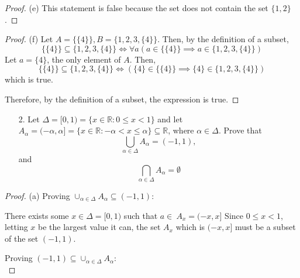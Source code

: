 \documentclass[10pt]{article}
\theoremstyle{definition}
\theoremstyle{plain}
\newcommand{\R}{\mathbb{R}}
\begin{document}
\begin{proof}{(e)}
  This statement is false because the set does not contain the set $\{1,2\}$.
\end{proof}

\begin{proof}{(f)}
  Let $A=\{\{4\}\}, B = \{1,2,3,\{4\}\}$. Then, by the definition of a subset,
  \begin{equation*}
    \{\{4\}\} \subseteq \{1,2,3,\{4\}\} \iff \forall a(a\in \{\{4\}\} \implies a\in \{1,2,3,\{4\}\})
  \end{equation*}
  Let $a=\{4\}$, the only element of $A$. Then,
  \begin{equation*}
      \{\{4\}\} \subseteq \{1,2,3,\{4\}\} \iff (\{4\}\in \{\{4\}\} \implies \{4\}\in \{1,2,3,\{4\}\})
  \end{equation*}
  which is true. \\

  \par Therefore, by the definition of a subset, the expression is true.
\end{proof}



\pagebreak



\begin{enumerate}
  \item[2.] Let $\Delta = [0,1) = \{x \in \R: 0 \leq x < 1\}$ and let $A_\alpha = (-\alpha,\alpha] = \{x \in \R: -\alpha < x \leq \alpha\} \subseteq \R$, where $\alpha \in \Delta$.  Prove that
      $$\bigcup_{\alpha \in \Delta} A_\alpha = (-1,1),$$
   and
      $$\bigcap_{\alpha \in \Delta} A_\alpha = \emptyset$$
\end{enumerate}

\begin{proof}{(a)}
  Proving $\cup_{\alpha \in \Delta} A_\alpha \subseteq (-1,1)$: \\

  \par There exists some $x\in\Delta = [0,1)$ such that $a\in\ A_x=(-x,x]$ Since $0 \leq x<1$, letting $x$ be the largest value it can, the set $A_x$ which is $(-x,x]$ must be a subset of the set $(-1,1)$. \\

  \par Proving $(-1,1) \subseteq \cup_{\alpha \in \Delta} A_\alpha$: \\

  \par
\end{proof}
\end{document}
